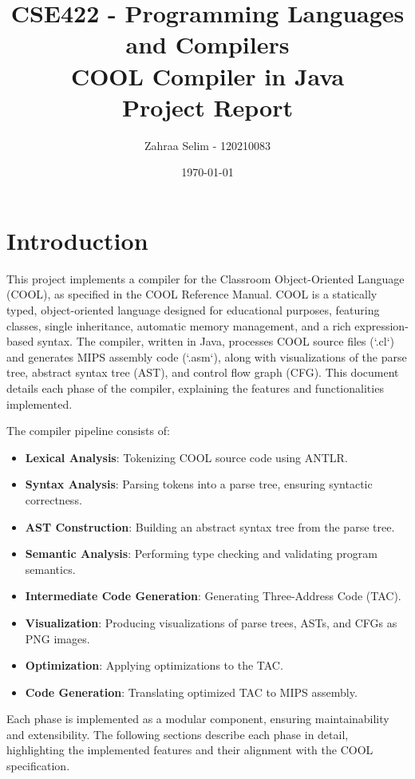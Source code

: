 \documentclass[titlepage]{article}
\title{
    CSE422 - Programming Languages and Compilers \\
    COOL Compiler in Java \\
    Project Report
}
\author{Zahraa Selim - 120210083}
\date{\today}
\begin{document}
\maketitle
\tableofcontents
\newpage

\section{Introduction}

This project implements a compiler for the Classroom Object-Oriented Language (COOL), as specified in the COOL Reference Manual. COOL is a statically typed, object-oriented language designed for educational purposes, featuring classes, single inheritance, automatic memory management, and a rich expression-based syntax. The compiler, written in Java, processes COOL source files (`.cl`) and generates MIPS assembly code (`.asm`), along with visualizations of the parse tree, abstract syntax tree (AST), and control flow graph (CFG). This document details each phase of the compiler, explaining the features and functionalities implemented.

The compiler pipeline consists of:
\begin{itemize}
    \item \textbf{Lexical Analysis}: Tokenizing COOL source code using ANTLR.
    \item \textbf{Syntax Analysis}: Parsing tokens into a parse tree, ensuring syntactic correctness.
    \item \textbf{AST Construction}: Building an abstract syntax tree from the parse tree.
    \item \textbf{Semantic Analysis}: Performing type checking and validating program semantics.
    \item \textbf{Intermediate Code Generation}: Generating Three-Address Code (TAC).
    \item \textbf{Visualization}: Producing visualizations of parse trees, ASTs, and CFGs as PNG images.
    \item \textbf{Optimization}: Applying optimizations to the TAC.
    \item \textbf{Code Generation}: Translating optimized TAC to MIPS assembly.
\end{itemize}

Each phase is implemented as a modular component, ensuring maintainability and extensibility. The following sections describe each phase in detail, highlighting the implemented features and their alignment with the COOL specification.
\end{document}
